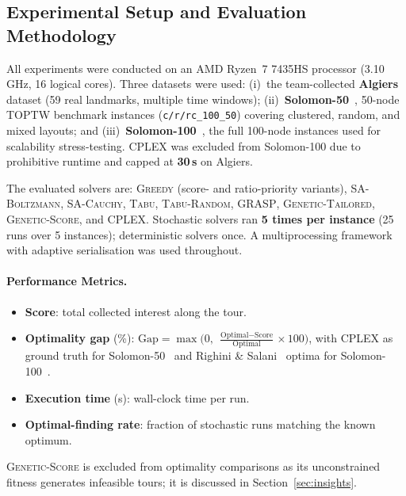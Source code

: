 \subsection{Experimental Setup and Evaluation Methodology}

All experiments were conducted on an AMD Ryzen~7 7435HS processor (3.10\,GHz, 16 logical cores).
Three datasets were used: (i)~the team-collected \textbf{Algiers} dataset (59 real landmarks,
multiple time windows); (ii)~\textbf{Solomon-50}~\cite{solomon50}, 50-node TOPTW benchmark
instances (\texttt{c/r/rc\_100\_50}) covering clustered, random, and mixed layouts; and
(iii)~\textbf{Solomon-100}~\cite{solomon100}, the full 100-node instances used for scalability
stress-testing. CPLEX was excluded from Solomon-100 due to prohibitive runtime and capped at
\textbf{30\,s} on Algiers.

The evaluated solvers are: \textsc{Greedy} (score- and ratio-priority variants),
\textsc{SA-Boltzmann}, \textsc{SA-Cauchy}, \textsc{Tabu}, \textsc{Tabu-Random}, \textsc{GRASP},
\textsc{Genetic-Tailored}, \textsc{Genetic-Score}, and \textsc{CPLEX}.
Stochastic solvers ran \textbf{5 times per instance} (25 runs over 5 instances); deterministic
solvers once. A multiprocessing framework with adaptive serialisation was used throughout.

\paragraph{Performance Metrics.}
\begin{itemize}[leftmargin=*, noitemsep, topsep=2pt]
  \item \textbf{Score}: total collected interest along the tour.
  \item \textbf{Optimality gap} (\%):
        $\mathrm{Gap} = \max\!\bigl(0,\;\tfrac{\text{Optimal}-\text{Score}}{\text{Optimal}}\times100\bigr)$,
        with CPLEX as ground truth for Solomon-50~\cite{solomon50} and
        Righini \& Salani~\cite{righini_salani} optima for Solomon-100~\cite{solomon100}.
  \item \textbf{Execution time} (s): wall-clock time per run.
  \item \textbf{Optimal-finding rate}: fraction of stochastic runs matching the known optimum.
\end{itemize}

\noindent\textsc{Genetic-Score} is excluded from optimality comparisons as its unconstrained
fitness generates infeasible tours; it is discussed in Section~\ref{sec:insights}.

